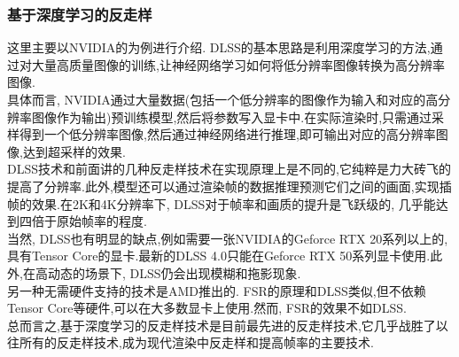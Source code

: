 \documentclass{ctexart}
\begin{document}
\subsubsection{基于深度学习的反走样}
这里主要以NVIDIA的为例进行介绍. DLSS的基本思路是利用深度学习的方法,通过对大量高质量图像的训练,让神经网络学习如何将低分辨率图像转换为高分辨率图像.\\
\indent 具体而言, NVIDIA通过大量数据(包括一个低分辨率的图像作为输入和对应的高分辨率图像作为输出)预训练模型,然后将参数写入显卡中.在实际渲染时,只需通过采样得到一个低分辨率图像,然后通过神经网络进行推理,即可输出对应的高分辨率图像,达到超采样的效果.\\
\indent DLSS技术和前面讲的几种反走样技术在实现原理上是不同的,它纯粹是力大砖飞的提高了分辨率.此外,模型还可以通过渲染帧的数据推理预测它们之间的画面,实现插帧的效果.在2K和4K分辨率下, DLSS对于帧率和画质的提升是飞跃级的, 几乎能达到四倍于原始帧率的程度.\\
\indent 当然, DLSS也有明显的缺点,例如需要一张NVIDIA的Geforce RTX 20系列以上的,具有Tensor Core的显卡.最新的DLSS 4.0只能在Geforce RTX 50系列显卡使用.此外,在高动态的场景下, DLSS仍会出现模糊和拖影现象.\\
\indent 另一种无需硬件支持的技术是AMD推出的. FSR的原理和DLSS类似,但不依赖Tensor Core等硬件,可以在大多数显卡上使用.然而, FSR的效果不如DLSS.\\
\indent 总而言之,基于深度学习的反走样技术是目前最先进的反走样技术,它几乎战胜了以往所有的反走样技术,成为现代渲染中反走样和提高帧率的主要技术.
\end{document}

